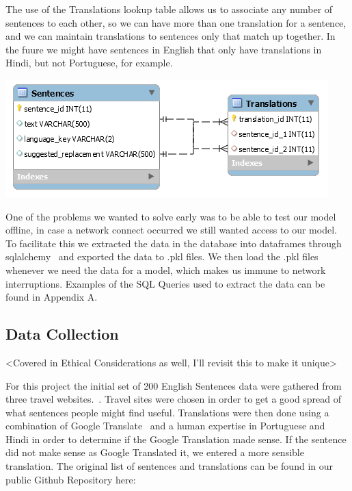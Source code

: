 \documentclass[runningheads]{llncs}
\begin{document}
	The use of the Translations lookup table allows us to associate any number of sentences to each other, so we can have more than one translation for a sentence, and we can maintain translations to sentences only that match up together. In the fuure we might have sentences in English that only have translations in Hindi, but not Portuguese, for example. 	

	\begin{minipage}{\linewidth}
		\begin{center}
			\includegraphics[width=\linewidth]{Database_Diagram.png}
			\label{fig:Database Diagrams}
			\vspace*{1cm}
		\end{center}
	\end{minipage}
	\afterpage{\clearpage}

	One of the problems we wanted to solve early was to be able to test our model offline, in case a network connect occurred we still wanted access to our model. To facilitate this we extracted the data in the database into dataframes through sqlalchemy~\cite{ref_url15} and exported the data to .pkl files. We then load the .pkl files whenever we need the data for a model, which makes us immune to network interruptions. Examples of the SQL Queries used to extract the data can be found in Appendix A.

	\subsection{Data Collection}
	<Covered in Ethical Considerations as well, I'll revisit this to make it unique>

	For this project the initial set of 200 English Sentences data were gathered from three travel websites.~\cite{ref_url11,ref_url12,ref_url13}. Travel sites were chosen in order to get a good spread of what sentences people might find useful. Translations were then done using a combination of Google Translate~\cite{ref_url14} and a human expertise in Portuguese and Hindi in order to determine if the Google Translation made sense. If the sentence did not make sense as Google Translated it, we entered a more sensible translation. The original list of sentences and translations can be found in our public Github Repository here:
\end{document}

